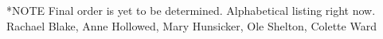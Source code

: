 *NOTE Final order is yet to be determined. Alphabetical listing right now. 
Rachael Blake,
Anne Hollowed,
Mary Hunsicker, 
Ole Shelton,
Colette Ward